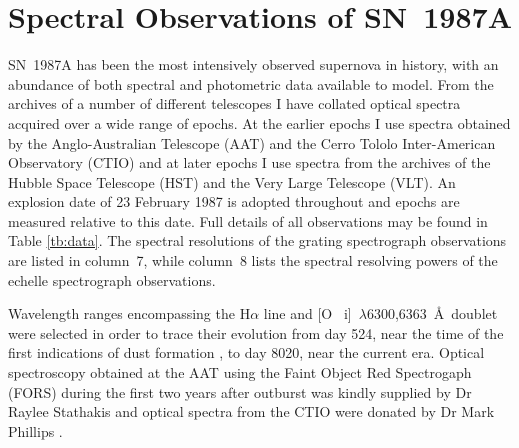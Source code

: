 \section{Spectral Observations of SN~1987A}
\label{spectra}


SN~1987A has been the most intensively observed supernova in history, with 
an abundance of both spectral and photometric data available to model.  From 
the archives of a number of different telescopes I have collated optical 
spectra acquired over a wide range of epochs.  At the earlier epochs I 
use spectra obtained by the Anglo-Australian Telescope (AAT) and the Cerro 
Tololo Inter-American Observatory (CTIO) and at later epochs I 
use spectra from the archives of the Hubble Space Telescope (HST) and the Very 
Large Telescope (VLT).  An explosion date of 23 February 1987 is adopted 
throughout and epochs are measured relative to this date.  Full details of 
all observations may be found in Table \ref{tb:data}. The spectral 
resolutions of the grating spectrograph observations are listed in 
column~7, while column~8 lists the spectral resolving powers of the 
echelle spectrograph observations.




Wavelength ranges encompassing the H$\alpha$ line and [O~{\sc 
i}]~$\lambda$6300,6363~\AA\ doublet were selected in order to trace their 
evolution from day 524, near the time of the first indications of dust 
formation \citep{Wooden1993}, to day 8020, near the current era. Optical 
spectroscopy obtained at the AAT using the Faint Object Red Spectrogaph 
(FORS) during the first two years after outburst was kindly supplied by Dr 
Raylee Stathakis \citep{Spyromilio1991, Spyromilio1993, Hanuschik1993} and 
optical spectra from the CTIO were donated by Dr Mark Phillips 
\citep{Suntzeff1991}.


